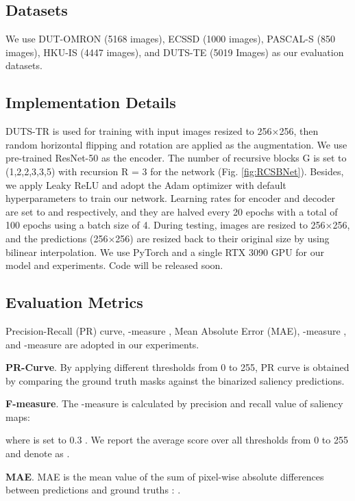 \documentclass[10pt,twocolumn,letterpaper]{article}
\begin{document}
\subsection{Datasets}
We use DUT-OMRON \cite{DUTO}(5168 images), ECSSD \cite{ECSSD}(1000 images), PASCAL-S \cite{PASCAL}(850 images), HKU-IS \cite{HKUIS}(4447 images), and DUTS-TE \cite{DUTSTE}(5019 Images) as our evaluation datasets.

\subsection{Implementation Details}
DUTS-TR \cite{DUTSTE} is used for training with input images resized to 256×256, then random horizontal flipping and  rotation are applied as the augmentation. We use pre-trained ResNet-50 \cite{ResNet} as the encoder. The number of recursive blocks G is set to (1,2,2,3,3,5) with recursion R = 3 for the network (Fig. \ref{fig:RCSBNet}). Besides, we apply Leaky ReLU \cite{LEAKY} and adopt the Adam optimizer \cite{ADAM} with default hyperparameters to train our network. Learning rates for encoder and decoder are set to  and  respectively, and they are halved every 20 epochs with a total of 100 epochs using a batch size of 4. During testing, images are resized to 256×256, and the predictions (256×256) are resized back to their original size by using bilinear interpolation. We use PyTorch \cite{TORCH} and a single RTX 3090 GPU for our model and experiments. Code will be released soon.

\subsection{ Evaluation Metrics}
\label{eval_metric}
Precision-Recall (PR) curve, -measure \cite{FBETA}, Mean Absolute Error (MAE), -measure \cite{WFMEASURE}, and -measure \cite{EMEASURE} are adopted in our experiments.

\textbf{PR-Curve}. By applying different thresholds from 0 to 255, PR curve is obtained by comparing the ground truth masks against the binarized saliency predictions. 

\textbf{F-measure}. The -measure is calculated by precision and recall value of saliency maps:

where  is set to 0.3 \cite{FBETA}. We report the average score over all thresholds from 0 to 255 and denote as  \cite{NLDF}\cite{BMPM}.

\textbf{MAE}. MAE is the mean value of the sum of pixel-wise absolute differences between predictions  and ground truths :  .
\end{document}
